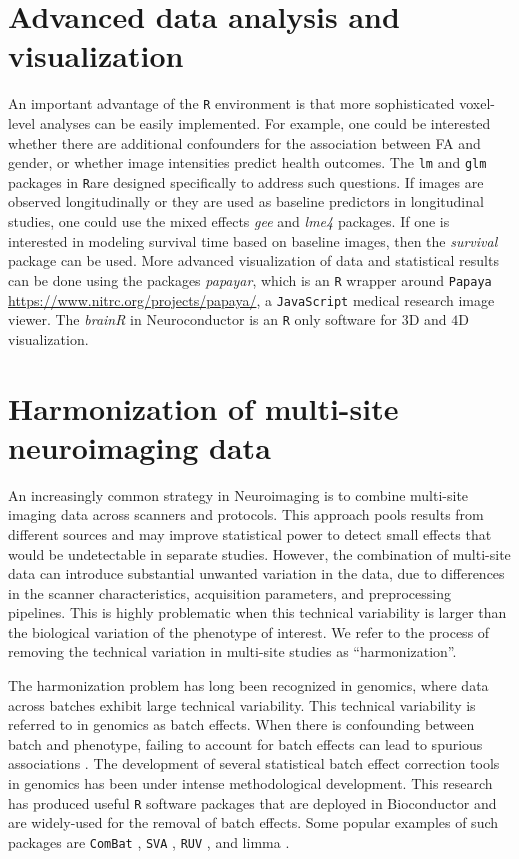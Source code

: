 \documentclass[]{elsarticle} %
\newcommand{\code}[1]{\texttt{#1}}
\newcommand{\pkg}[1]{\emph{#1}}
\newcommand{\rlang}{\texttt{R}}
\begin{document}
\section{Advanced data analysis and visualization}
An important advantage  of the  {\rlang} environment  is that  more sophisticated voxel-level analyses can be easily implemented.  For  example, one could be interested  whether  there  are  additional confounders  for the association between FA and gender, or  whether  image intensities predict health outcomes. The \code{lm} and \code{glm} packages in \rlang are designed specifically to address such questions. If images are observed longitudinally or they are used as baseline predictors in longitudinal studies, one could use the mixed effects \pkg{gee} \cite{gee} and \pkg{lme4} \cite{lme4} packages. If one is interested in modeling survival time based on baseline images, then the \pkg{survival} package \citep{survival-package,survival-book} can be used. More advanced visualization of data and statistical results can be done using the packages \pkg{papayar}, which is an {\rlang} wrapper around \texttt{Papaya} \url{https://www.nitrc.org/projects/papaya/}, a \texttt{JavaScript} medical research image viewer. The \pkg{brainR} in Neuroconductor is an {\rlang} only software for $3$D and $4$D visualization.

\section{Harmonization of multi-site neuroimaging data}\label{sec:datafusion}

An increasingly common strategy in Neuroimaging is to combine multi-site imaging data across scanners and protocols. This approach pools results from different sources and may improve statistical power to detect small effects  that would be undetectable in separate studies. However, the combination of multi-site data can introduce substantial unwanted variation in the data, due to differences in the scanner characteristics,  acquisition parameters, and preprocessing pipelines. This is highly problematic when this technical variability is larger than the biological variation of the phenotype of interest. We refer to the process of removing the technical variation in multi-site studies as ``harmonization''. 

The harmonization problem has long been recognized in genomics, where data across batches exhibit large technical variability. This technical variability is referred to in genomics as batch effects. When there is confounding between batch and phenotype, failing to account for batch effects can lead to spurious associations \citep{batchreview}. The development of several statistical batch effect correction tools in genomics has been under intense methodological development. This research has produced useful {\rlang} software packages that are deployed in Bioconductor and  are widely-used for the removal of batch effects. Some popular examples of such packages are  \texttt{ComBat} \citep{combat}, \texttt{SVA} \citep{sva1,sva2}, \texttt{RUV} \citep{ruv}, and limma \citep{limma1,limma2}. 
\end{document}
